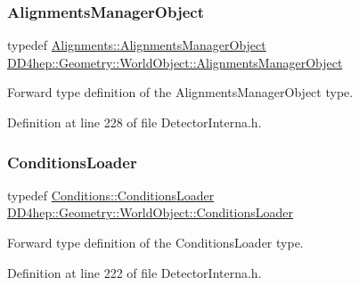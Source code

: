 \subsubsection{\texorpdfstring{Alignments\+Manager\+Object}{AlignmentsManagerObject}}
{\footnotesize\ttfamily typedef \hyperlink{class_d_d4hep_1_1_alignments_1_1_alignments_manager_object}{Alignments\+::\+Alignments\+Manager\+Object} \hyperlink{class_d_d4hep_1_1_geometry_1_1_world_object_ac5c3ed360e547df41b814ee0c5fddf9f}{D\+D4hep\+::\+Geometry\+::\+World\+Object\+::\+Alignments\+Manager\+Object}}



Forward type definition of the Alignments\+Manager\+Object type. 



Definition at line 228 of file Detector\+Interna.\+h.

\hypertarget{class_d_d4hep_1_1_geometry_1_1_world_object_ab3186f89db27a386504504645203d688}{}\label{class_d_d4hep_1_1_geometry_1_1_world_object_ab3186f89db27a386504504645203d688} 
\subsubsection{\texorpdfstring{Conditions\+Loader}{ConditionsLoader}}
{\footnotesize\ttfamily typedef \hyperlink{class_d_d4hep_1_1_conditions_1_1_conditions_loader}{Conditions\+::\+Conditions\+Loader} \hyperlink{class_d_d4hep_1_1_geometry_1_1_world_object_ab3186f89db27a386504504645203d688}{D\+D4hep\+::\+Geometry\+::\+World\+Object\+::\+Conditions\+Loader}}



Forward type definition of the Conditions\+Loader type. 



Definition at line 222 of file Detector\+Interna.\+h.

\hypertarget{class_d_d4hep_1_1_geometry_1_1_world_object_a96576e6e392fe72924c1135cc8907aec}{}\label{class_d_d4hep_1_1_geometry_1_1_world_object_a96576e6e392fe72924c1135cc8907aec} 
